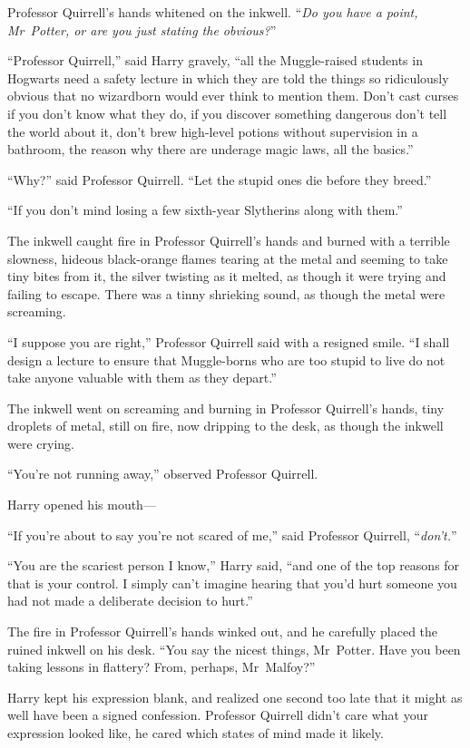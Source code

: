 Professor Quirrell’s hands whitened on the inkwell. “\emph{Do you have a point, Mr~Potter, or are you just stating the obvious?}”

“Professor Quirrell,” said Harry gravely, “all the Muggle-raised students in Hogwarts need a safety lecture in which they are told the things so ridiculously obvious that no wizardborn would ever think to mention them. Don’t cast curses if you don’t know what they do, if you discover something dangerous don’t tell the world about it, don’t brew high-level potions without supervision in a bathroom, the reason why there are underage magic laws, all the basics.”

“Why?” said Professor Quirrell. “Let the stupid ones die before they breed.”

“If you don’t mind losing a few sixth-year Slytherins along with them.”

The inkwell caught fire in Professor Quirrell’s hands and burned with a terrible slowness, hideous black-orange flames tearing at the metal and seeming to take tiny bites from it, the silver twisting as it melted, as though it were trying and failing to escape. There was a tinny shrieking sound, as though the metal were screaming.

“I suppose you are right,” Professor Quirrell said with a resigned smile. “I shall design a lecture to ensure that Muggle-borns who are too stupid to live do not take anyone valuable with them as they depart.”

The inkwell went on screaming and burning in Professor Quirrell’s hands, tiny droplets of metal, still on fire, now dripping to the desk, as though the inkwell were crying.

“You’re not running away,” observed Professor Quirrell.

Harry opened his mouth—

“If you’re about to say you’re not scared of me,” said Professor Quirrell, “\emph{don’t.}”

“You are the scariest person I know,” Harry said, “and one of the top reasons for that is your control. I simply can’t imagine hearing that you’d hurt someone you had not made a deliberate decision to hurt.”

The fire in Professor Quirrell’s hands winked out, and he carefully placed the ruined inkwell on his desk. “You say the nicest things, Mr~Potter. Have you been taking lessons in flattery? From, perhaps, Mr~Malfoy?”

Harry kept his expression blank, and realized one second too late that it might as well have been a signed confession. Professor Quirrell didn’t care what your expression looked like, he cared which states of mind made it likely.

